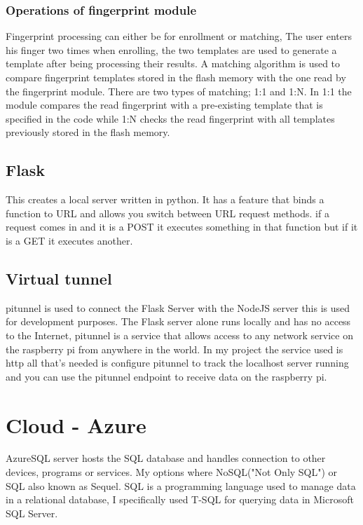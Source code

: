 \subsubsection{Operations of fingerprint module}
Fingerprint processing can either be for enrollment or matching, The user enters his finger two times when enrolling, the two templates are used to generate a template after being processing their results. 
A matching algorithm is used to compare fingerprint templates stored in the flash memory with the one read by the fingerprint module. There are two types of matching; 1:1 and 1:N. In 1:1 the module compares the read fingerprint with a pre-existing template that is specified in the code while 1:N checks the read fingerprint with all templates previously stored in the flash memory.


\subsection{Flask}
This creates a local server written in python. It has a feature that binds a function to URL and allows you switch between URL request methods. if a request comes in and it is a POST it executes something in that function but if it is a GET it executes another.

\subsection{Virtual tunnel}
pitunnel is used to connect the Flask Server with the NodeJS server this is used for development purposes. The Flask server alone runs locally and has no access to the Internet, pitunnel is a service that allows access to any network service on the raspberry pi from anywhere in the world. In my project the service used is http all that's needed is configure pitunnel to track the localhost server running and you can use the pitunnel endpoint to receive data on the raspberry pi.



\section{Cloud - Azure}
AzureSQL server hosts the SQL database and handles connection to other devices, programs or services. 
My options where NoSQL("Not Only SQL") or SQL also known as Sequel.
SQL is a programming language used to manage data in a relational database, I specifically used T-SQL for querying data in Microsoft SQL Server. 

